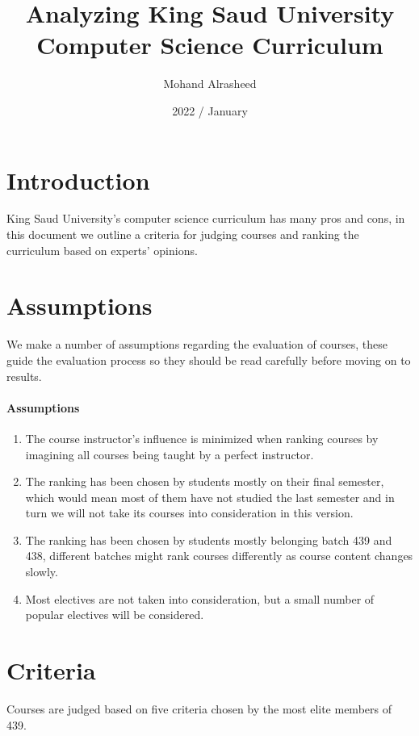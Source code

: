 \documentclass[12pt,a4paper]{article}
\title{Analyzing King Saud University Computer Science Curriculum}
\author{Mohand Alrasheed}
\date{2022 / January}
\begin{document}

\maketitle
\clearpage

\tableofcontents
\clearpage


\section{Introduction}
King Saud University's computer science curriculum has many pros and cons, in this document we outline a criteria for judging courses and ranking the curriculum based on experts' opinions.

\section{Assumptions} 
We make a number of assumptions regarding the evaluation of courses, these guide the evaluation process so they should be read carefully before moving on to results.

\paragraph{Assumptions}
\begin{enumerate}
    \item The course instructor's influence is minimized when ranking courses by imagining all courses being taught by a perfect instructor.
    \item The ranking has been chosen by students mostly on their final semester, which would mean most of them have not studied the last semester and in turn we will not take its courses into consideration in this version.
    \item The ranking has been chosen by students mostly belonging batch 439 and 438, different batches might rank courses differently as co\textbf{}urse content changes slowly.
    \item Most electives are not taken into consideration, but a small number of popular electives will be considered. 
\end{enumerate}

\section{Criteria}
Courses are judged based on five criteria chosen by the most elite members of 439.
\end{document}
